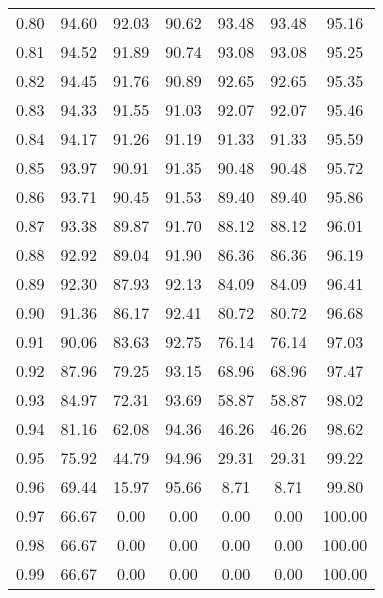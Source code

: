 \begin{tabular}{|c|c|c|c|c|c|c|}
      0.80 &     94.60 &     92.03 &      90.62 &   93.48 &      93.48 &         95.16 \\
      0.81 &     94.52 &     91.89 &      90.74 &   93.08 &      93.08 &         95.25 \\
      0.82 &     94.45 &     91.76 &      90.89 &   92.65 &      92.65 &         95.35 \\
      0.83 &     94.33 &     91.55 &      91.03 &   92.07 &      92.07 &         95.46 \\
      0.84 &     94.17 &     91.26 &      91.19 &   91.33 &      91.33 &         95.59 \\
      0.85 &     93.97 &     90.91 &      91.35 &   90.48 &      90.48 &         95.72 \\
      0.86 &     93.71 &     90.45 &      91.53 &   89.40 &      89.40 &         95.86 \\
      0.87 &     93.38 &     89.87 &      91.70 &   88.12 &      88.12 &         96.01 \\
      0.88 &     92.92 &     89.04 &      91.90 &   86.36 &      86.36 &         96.19 \\
      0.89 &     92.30 &     87.93 &      92.13 &   84.09 &      84.09 &         96.41 \\
      0.90 &     91.36 &     86.17 &      92.41 &   80.72 &      80.72 &         96.68 \\
      0.91 &     90.06 &     83.63 &      92.75 &   76.14 &      76.14 &         97.03 \\
      0.92 &     87.96 &     79.25 &      93.15 &   68.96 &      68.96 &         97.47 \\
      0.93 &     84.97 &     72.31 &      93.69 &   58.87 &      58.87 &         98.02 \\
      0.94 &     81.16 &     62.08 &      94.36 &   46.26 &      46.26 &         98.62 \\
      0.95 &     75.92 &     44.79 &      94.96 &   29.31 &      29.31 &         99.22 \\
      0.96 &     69.44 &     15.97 &      95.66 &    8.71 &       8.71 &         99.80 \\
      0.97 &     66.67 &      0.00 &       0.00 &    0.00 &       0.00 &        100.00 \\
      0.98 &     66.67 &      0.00 &       0.00 &    0.00 &       0.00 &        100.00 \\
      0.99 &     66.67 &      0.00 &       0.00 &    0.00 &       0.00 &        100.00 \\
\bottomrule
\end{tabular}
